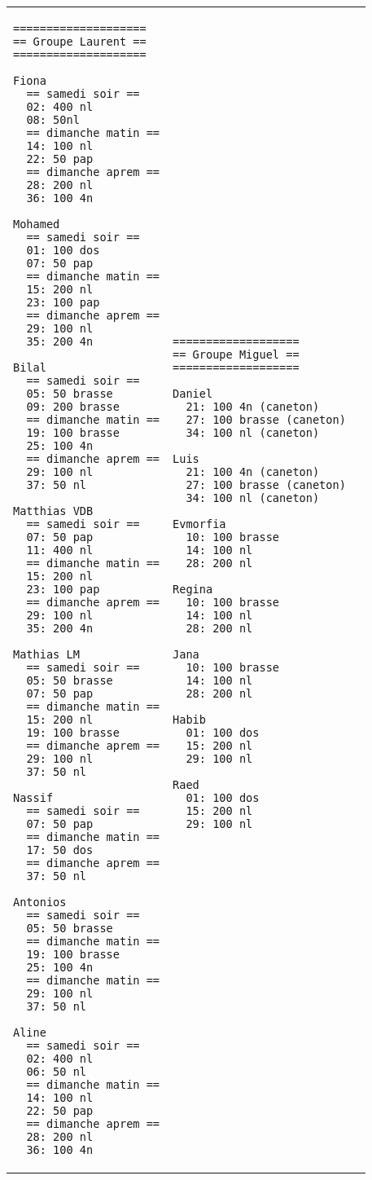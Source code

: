 \documentclass{article}
\begin{document}
{\scriptsize\begin{tabular}{|p{5cm}|p{5cm}|p{5cm}|}
\hline
\begin{verbatim}
====================
== Groupe Laurent ==
====================

Fiona
  == samedi soir ==
  02: 400 nl
  08: 50nl
  == dimanche matin ==
  14: 100 nl
  22: 50 pap
  == dimanche aprem ==
  28: 200 nl
  36: 100 4n

Mohamed
  == samedi soir ==
  01: 100 dos
  07: 50 pap
  == dimanche matin ==
  15: 200 nl
  23: 100 pap
  == dimanche aprem ==
  29: 100 nl
  35: 200 4n

Bilal
  == samedi soir ==
  05: 50 brasse
  09: 200 brasse
  == dimanche matin ==
  19: 100 brasse
  25: 100 4n
  == dimanche aprem ==
  29: 100 nl
  37: 50 nl

Matthias VDB
  == samedi soir ==
  07: 50 pap
  11: 400 nl
  == dimanche matin ==
  15: 200 nl
  23: 100 pap
  == dimanche aprem ==
  29: 100 nl
  35: 200 4n

Mathias LM 
  == samedi soir ==
  05: 50 brasse
  07: 50 pap
  == dimanche matin ==
  15: 200 nl
  19: 100 brasse
  == dimanche aprem ==
  29: 100 nl
  37: 50 nl

Nassif
  == samedi soir ==
  07: 50 pap
  == dimanche matin ==
  17: 50 dos
  == dimanche aprem ==
  37: 50 nl

Antonios
  == samedi soir ==
  05: 50 brasse
  == dimanche matin ==
  19: 100 brasse
  25: 100 4n
  == dimanche matin ==
  29: 100 nl
  37: 50 nl

Aline
  == samedi soir ==
  02: 400 nl
  06: 50 nl
  == dimanche matin ==
  14: 100 nl
  22: 50 pap
  == dimanche aprem ==
  28: 200 nl
  36: 100 4n
\end{verbatim}
&
\begin{verbatim}
===================
== Groupe Miguel ==
===================

Daniel
  21: 100 4n (caneton)
  27: 100 brasse (caneton)
  34: 100 nl (caneton)

Luis
  21: 100 4n (caneton)
  27: 100 brasse (caneton)
  34: 100 nl (caneton)

Evmorfia
  10: 100 brasse
  14: 100 nl
  28: 200 nl

Regina
  10: 100 brasse
  14: 100 nl
  28: 200 nl

Jana
  10: 100 brasse
  14: 100 nl
  28: 200 nl

Habib
  01: 100 dos
  15: 200 nl
  29: 100 nl

Raed
  01: 100 dos
  15: 200 nl
  29: 100 nl


\end{verbatim}
\end{tabular}}
\end{document}
